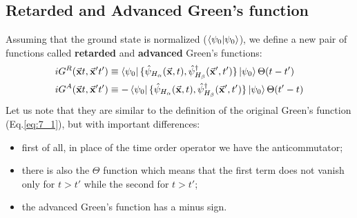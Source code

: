 \documentclass[../main/main.tex]{subfiles}
\begin{document}
\subsection{Retarded and Advanced Green's function}

Assuming that the ground state is normalized (\( \braket{\psi _0}{\psi _0}  \)), we define a new pair of functions called \textbf{retarded} and \textbf{advanced} Green's functions:
\begin{subequations}
\begin{align}
   i G^R (\va{x}t, \va{x}'t') & \equiv
   \bra{\psi _0} \{ \hat{\psi }_{H_ \alpha } (\va{x},t), \hat{\psi }_{H_ \beta } ^\dag  (\va{x}',t')  \} \ket{\psi_0} \Theta (t-t')      \\
   i G^A (\va{x}t, \va{x}'t') & \equiv
   -
   \bra{\psi _0} \{ \hat{\psi }_{H_ \alpha } (\va{x},t), \hat{\psi }_{H_ \beta } ^\dag  (\va{x}',t')  \} \ket{\psi_0} \Theta (t'-t)
\end{align}
\end{subequations}
Let us note that they are similar to the definition of the original Green's function (Eq.\eqref{eq:7_1}), but with important differences:
\begin{itemize}
\item first of all, in place of the time order operator we have the anticommutator;
\item there is also the \( \Theta  \) function which means that the first term does not vanish only for \( t>t' \) while the second for \( t>t' \);
\item the advanced Green's function has a minus sign.
\end{itemize}
\end{document}

